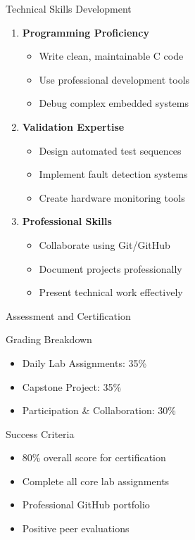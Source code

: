 \documentclass[aspectratio=169]{beamer}
\begin{document}
\begin{frame}{Technical Skills Development}
  \begin{enumerate}
    \item \textbf{Programming Proficiency}
    \begin{itemize}
      \item Write clean, maintainable C code
      \item Use professional development tools
      \item Debug complex embedded systems
    \end{itemize}

    \item \textbf{Validation Expertise}
    \begin{itemize}
      \item Design automated test sequences
      \item Implement fault detection systems
      \item Create hardware monitoring tools
    \end{itemize}

    \item \textbf{Professional Skills}
    \begin{itemize}
      \item Collaborate using Git/GitHub
      \item Document projects professionally
      \item Present technical work effectively
    \end{itemize}
  \end{enumerate}
\end{frame}

\begin{frame}{Assessment and Certification}
  \begin{block}{Grading Breakdown}
    \begin{itemize}
      \item Daily Lab Assignments: 35\%
      \item Capstone Project: 35\%
      \item Participation \& Collaboration: 30\%
    \end{itemize}
  \end{block}

  \begin{block}{Success Criteria}
    \begin{itemize}
      \item 80\% overall score for certification
      \item Complete all core lab assignments
      \item Professional GitHub portfolio
      \item Positive peer evaluations
    \end{itemize}
  \end{block}
\end{frame}
\end{document}
